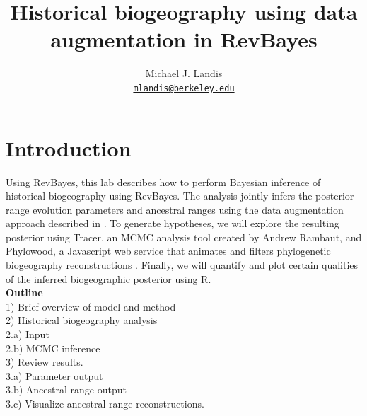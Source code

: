 \documentclass[11pt]{article}
\begin{document}


\title{Historical biogeography using data augmentation in RevBayes}
\author{Michael J. Landis \\ \href{mailto:mlandis@berkeley.edu}{\texttt{mlandis@berkeley.edu}}}
\maketitle

\section{Introduction}

Using RevBayes, this lab describes how to perform Bayesian inference of historical biogeography using RevBayes. The analysis jointly infers the posterior range evolution parameters and ancestral ranges using the data augmentation approach described in \citet{landis13}.
To generate hypotheses, we will explore the resulting posterior using Tracer, an MCMC analysis tool created by Andrew Rambaut, and Phylowood, a Javascript web service that animates and filters phylogenetic biogeography reconstructions \citep{landis14}.
Finally, we will quantify and plot certain qualities of the inferred biogeographic posterior using R. \\


\noindent \textbf{Outline} \\
1) Brief overview of model and method \\
2) Historical biogeography analysis \\
2.a) Input \\
2.b) MCMC inference \\
3) Review results. \\
3.a) Parameter output \\
3.b) Ancestral range output \\
3.c) Visualize ancestral range reconstructions. \\

\end{document}
